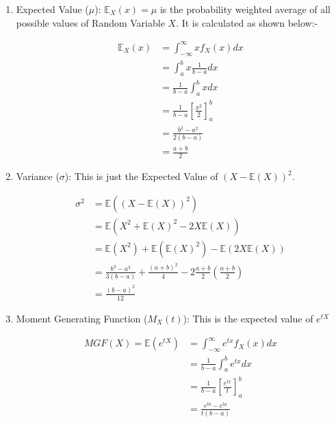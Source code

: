 \documentclass[12pt, a4paper, titlepage]{article}
\begin{document}
\begin{enumerate}
{			 }
	\item{Expected Value ($\mu$): $\mathbb{E}_X(x) = \mu$ is the probability weighted average of all possible values of Random Variable $X$. It is calculated as shown below:-
\begin{center}
			\begin{align*}
					\mathbb{E}_X(x) &= \int_{-\infty}^{\infty} x f_X(x) dx 
					\\
					 &= \int_{a}^{b} x \frac{1}{b-a} dx 
					\\
					 &= \frac{1}{b-a} \int_{a}^{b} x dx 
					\\
					&= \frac{1}{b-a} \left[ \frac{x^2}{2} \right]_a^b
					\\
					&= \frac{b^2 - a^2}{2(b-a)}
					\\
					&= \frac{a+b}{2}
			\end{align*}
\end{center}
}\newpage
	\item{Variance ($\sigma$): This is just the Expected Value of $(X - \mathbb{E}(X))^2$.
\begin{center}
			\begin{align*}
					\sigma^2 &= \mathbb{E}\left( (X - \mathbb{E}(X))^2 \right)
					\\
					 &= \mathbb{E}\left( X^2 + \mathbb{E}(X)^2 - 2X\mathbb{E}(X) \right)
					\\
					 &= \mathbb{E}( X^2 )+ \mathbb{E}( \mathbb{E}(X)^2 ) -  \mathbb{E}(2X\mathbb{E}(X) )
					\\
					&= \frac{b^3 - a^3}{3(b-a)} + \frac{(a+b)^2}{4} - 2\frac{a+b}{2}\left(\frac{a+b}{2}\right)
					\\
					&= \frac{(b - a)^2}{12}
			\end{align*}
\end{center}


}
	\item{Moment Generating Function ($M_X(t)$): This is the expected value of $e^{tX}$
\begin{center}
			\begin{align*}
				MGF(X) = \mathbb{E}\left( e^{tX} \right) &= \int_{-\infty}^{\infty} e^{tx} f_X(x) dx
					\\
					 &= \frac{1}{b-a} \int_a^be^{tx} dx
					\\
					 &= \frac{1}{b-a} \left[ \frac{e^{tx}}{t} \right]_a^b
					\\
					&= \frac{e^{tb} - e^{ta}}{t(b-a)}
			\end{align*}
\end{center}




}
\end{enumerate}



\end{document}
